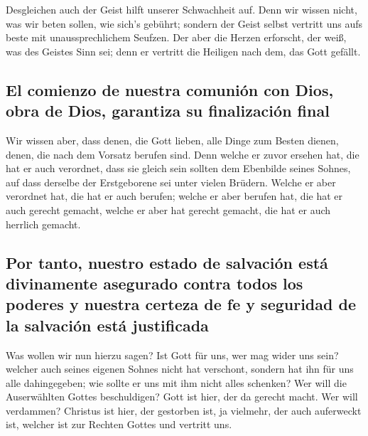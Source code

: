  Desgleichen auch der Geist hilft unserer Schwachheit
auf. Denn wir wissen nicht, was wir beten sollen, wie sich's gebührt;
sondern der Geist selbst vertritt uns aufs beste mit unaussprechlichem
Seufzen.  Der aber die Herzen erforscht, der weiß, was
des Geistes Sinn sei; denn er vertritt die Heiligen nach dem, das Gott
gefällt.

\hypertarget{el-comienzo-de-nuestra-comuniuxf3n-con-dios-obra-de-dios-garantiza-su-finalizaciuxf3n-final}{%
\subsection{El comienzo de nuestra comunión con Dios, obra de Dios,
garantiza su finalización
final}\label{el-comienzo-de-nuestra-comuniuxf3n-con-dios-obra-de-dios-garantiza-su-finalizaciuxf3n-final}}

 Wir wissen aber, dass denen, die Gott lieben, alle Dinge
zum Besten dienen, denen, die nach dem Vorsatz berufen sind.
 Denn welche er zuvor ersehen hat, die hat er auch
verordnet, dass sie gleich sein sollten dem Ebenbilde seines Sohnes, auf
dass derselbe der Erstgeborene sei unter vielen Brüdern. 
Welche er aber verordnet hat, die hat er auch berufen; welche er aber
berufen hat, die hat er auch gerecht gemacht, welche er aber hat gerecht
gemacht, die hat er auch herrlich gemacht.

\hypertarget{por-tanto-nuestro-estado-de-salvaciuxf3n-estuxe1-divinamente-asegurado-contra-todos-los-poderes-y-nuestra-certeza-de-fe-y-seguridad-de-la-salvaciuxf3n-estuxe1-justificada}{%
\subsection{Por tanto, nuestro estado de salvación está divinamente
asegurado contra todos los poderes y nuestra certeza de fe y seguridad
de la salvación está
justificada}\label{por-tanto-nuestro-estado-de-salvaciuxf3n-estuxe1-divinamente-asegurado-contra-todos-los-poderes-y-nuestra-certeza-de-fe-y-seguridad-de-la-salvaciuxf3n-estuxe1-justificada}}

 Was wollen wir nun hierzu sagen? Ist Gott für uns, wer
mag wider uns sein?  welcher auch seines eigenen Sohnes
nicht hat verschont, sondern hat ihn für uns alle dahingegeben; wie
sollte er uns mit ihm nicht alles schenken?  Wer will die
Auserwählten Gottes beschuldigen? Gott ist hier, der da gerecht macht.
 Wer will verdammen? Christus ist hier, der gestorben
ist, ja vielmehr, der auch auferweckt ist, welcher ist zur Rechten
Gottes und vertritt uns.

